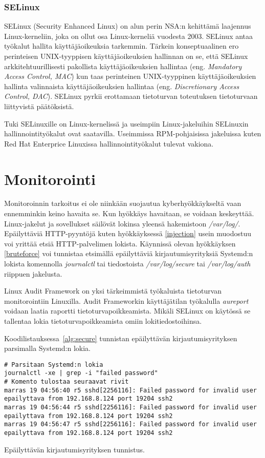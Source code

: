 \subsubsection{SELinux}\label{selinux}
SELinux (Security Enhanced Linux) on alun perin NSA:n kehittämä laajennus Linux-kerneliin, joka on ollut osa Linux-kerneliä vuodesta 2003. SELinux antaa työkalut hallita käyttäjäoikeuksia tarkemmin. Tärkein konseptuaalinen ero perinteisen UNIX-tyyppisen käyttäjäoikeuksien hallinnan on se, että SELinux arkkitehtuurillisesti pakollista käyttäjäoikeuksien hallintaa (eng. \textit{Mandatory Access Control, MAC}) kun taas perinteinen UNIX-tyyppinen käyttäjäoikeuksien hallinta valinnaista käyttäjäoikeuksien hallintaa (eng. \textit{Discretionary Access Control, DAC}). SELinux pyrkii erottamaan tietoturvan toteutuksen tietoturvaan liittyvistä päätöksistä.

Tuki SELinuxille on Linux-kernelissä ja useimpiin Linux-jakeluihin SELinuxin hallinnointityökalut ovat saatavilla. Useimmissa RPM-pohjaisissa jakeluissa kuten Red Hat Enterprice Linuxissa hallinnointityökalut tulevat vakiona.~\cite{selinux}

\section{Monitorointi}\label{monitorointi}
Monitoroinnin tarkoitus ei ole niinkään suojautua kyberhyökkäykseltä vaan ennemminkin keino havaita se. Kun hyökkäys havaitaan, se voidaan keskeyttää. Linux-jakelut ja sovellukset säilövät lokinsa yleensä hakemistoon \textit{/var/log/}. Epäilyttäviä HTTP-pyyntöjä kuten hyökkäyksessä \ref{injection} usein muodostuu voi yrittää etsiä HTTP-palvelimen lokista. Käynnissä olevan hyökkäyksen \ref{bruteforce} voi tunnistaa etsimällä epäilyttäviä kirjautumisyrityksiä Systemd:n lokista komennolla \textit{journalctl} tai tiedostoista \textit{/var/log/secure} tai \textit{/var/log/auth} riippuen jakelusta. 

Linux Audit Framework on yksi tärkeimmistä työkaluista tietoturvan monitorointiin Linuxilla. Audit Frameworkin käyttäjätilan työkalulla \textit{aureport} voidaan laatia raportti tietoturvapoikkeamista. Mikäli SELinux on käytössä se tallentaa lokia tietoturvapoikkeamista omiin lokitiedostoihinsa.~\cite{xplg}

Koodilistauksessa~\ref{alg:secure} tunnistan epäilyttävän kirjautumisyrityksen parsimalla Systemd:n lokia.

\begin{algorithm}[tbh]
\begin{verbatim}
# Parsitaan Systemd:n lokia
journalctl -xe | grep -i "failed password"
# Komento tulostaa seuraavat rivit
marras 19 04:56:40 r5 sshd[2256116]: Failed password for invalid user
epailyttava from 192.168.8.124 port 19204 ssh2
marras 19 04:56:44 r5 sshd[2256116]: Failed password for invalid user
epailyttava from 192.168.8.124 port 19204 ssh2
marras 19 04:56:47 r5 sshd[2256116]: Failed password for invalid user
epailyttava from 192.168.8.124 port 19204 ssh2
\end{verbatim}
\caption{Epäilyttävän kirjautumisyrityksen tunnistus.\label{alg:secure}}
\end{algorithm}
